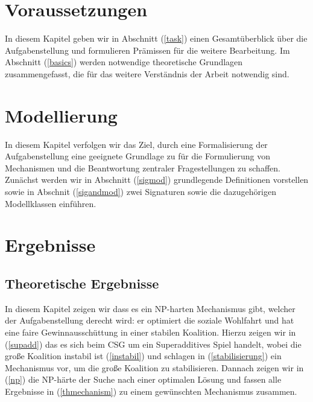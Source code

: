 \documentclass[sigconf]{acmart}
\theoremstyle{break}
\begin{document}
\section{Voraussetzungen}
\label{vorraus}
In diesem Kapitel geben wir in Abschnitt (\ref{task}) einen Gesamtüberblick über die Aufgabenstellung und formulieren Prämissen für die weitere Bearbeitung. Im Abschnitt (\ref{basics}) werden notwendige theoretische Grundlagen zusammengefasst, die für das weitere Verständnis der Arbeit notwendig sind.


\section{Modellierung}
\label{mod}
In diesem Kapitel verfolgen wir das Ziel, durch eine Formalisierung der Aufgabenstellung eine geeignete Grundlage zu für die Formulierung von Mechanismen und die Beantwortung zentraler Fragestellungen zu schaffen. Zunächst werden wir in Abschnitt (\ref{sigmod}) grundlegende Definitionen vorstellen sowie in Abschnit (\ref{sigandmod}) zwei Signaturen sowie die dazugehörigen Modellklassen einführen.



\section{Ergebnisse}
\label{ergebnisse}
\subsection{Theoretische Ergebnisse}
In diesem Kapitel zeigen wir dass es ein NP-harten Mechanismus gibt, welcher der Aufgabenstellung derecht wird: er optimiert die soziale Wohlfahrt und hat eine faire Gewinnausschüttung in einer stabilen Koalition. Hierzu zeigen wir in (\ref{supadd}) das es sich beim CSG um ein Superadditives Spiel handelt, wobei die große Koalition instabil ist (\ref{instabil}) und schlagen in (\ref{stabilisierung}) ein Mechanismus vor, um die große Koalition zu stabilisieren. Dannach zeigen wir in (\ref{np}) die NP-härte der Suche nach einer optimalen Lösung und fassen alle Ergebnisse in (\ref{thmechanism}) zu einem gewünschten Mechanismus zusammen.

\end{document}
